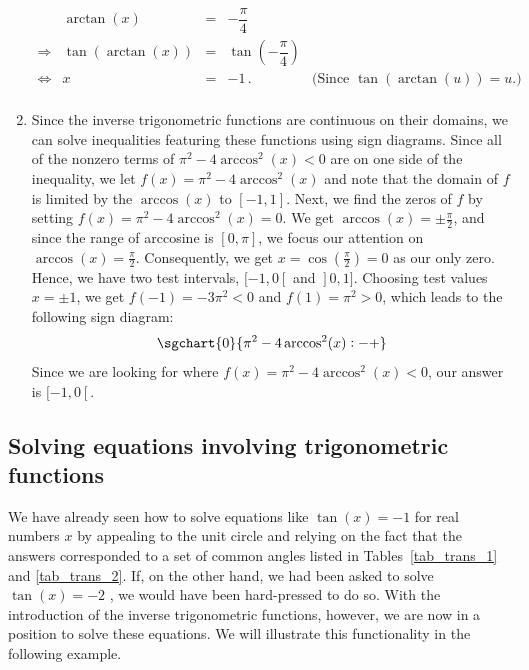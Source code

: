 \begin{example}
\begin{enumerate}
\[\begin{array}{rrclr}
&\arctan(x) & = & -\dfrac{\pi}{4} & \\ [5pt]
\Rightarrow&\tan(\arctan(x)) & = & \tan\left(-\dfrac{\pi}{4}\right) & \\ [5pt]
\Leftrightarrow&x & = & -1\,. & \text{(Since $\tan(\arctan(u)) = u$.)} \\ \end{array}\]
\renewcommand{\arraystretch}{1}%
\item Since the inverse trigonometric functions are continuous on their domains, we can solve inequalities featuring these functions using sign diagrams. Since all of the nonzero terms of  $\pi^2-4\arccos^{2}(x) < 0$ are on one side of the inequality, we let $f(x) = \pi^2-4\arccos^{2}(x)$ and note that the domain of $f$ is limited by the $\arccos(x)$ to $[-1,1]$.  Next, we find the zeros of $f$ by setting $f(x) = \pi^2-4\arccos^{2}(x) = 0$.  We get $\arccos(x) = \pm \frac{\pi}{2}$, and since the range of arccosine is $[0,\pi]$, we focus our attention on $\arccos(x) = \frac{\pi}{2}$.  Consequently, we get $x = \cos\left(\frac{\pi}{2}\right) = 0$ as our only zero.  Hence, we have two test intervals, $[-1,0\left[\right.$ and $\left.\right]0,1]$.  Choosing test values $x = \pm 1$, we get $f(-1) = -3\pi^2 < 0$ and $f(1) = \pi^2 > 0$, which leads to the following sign diagram:
$$
\sgchart{0} {\pi^2-4\arccos^{2}(x): -+}
$$
 Since we are looking for where $f(x) = \pi^2-4\arccos^{2}(x) < 0$, our answer is $[-1,0\left[\right.$.  


\end{enumerate}
\end{example}
\fi





\ifcourse
\subsection{Solving equations involving trigonometric functions}
We have already seen how to solve equations like $\tan(x) = -1$ for real numbers $x$ by appealing to the unit circle and relying on the fact that the answers corresponded to a set of common angles listed in Tables~\ref{tab_trans_1} and \ref{tab_trans_2}.  If, on the other hand, we had been asked to solve $\tan(x) = -2$ , we would have been hard-pressed to do so.  With the introduction of the inverse trigonometric functions, however, we are now in a position to solve these equations.  
\ifcalculus We will illustrate this functionality in the following example.

